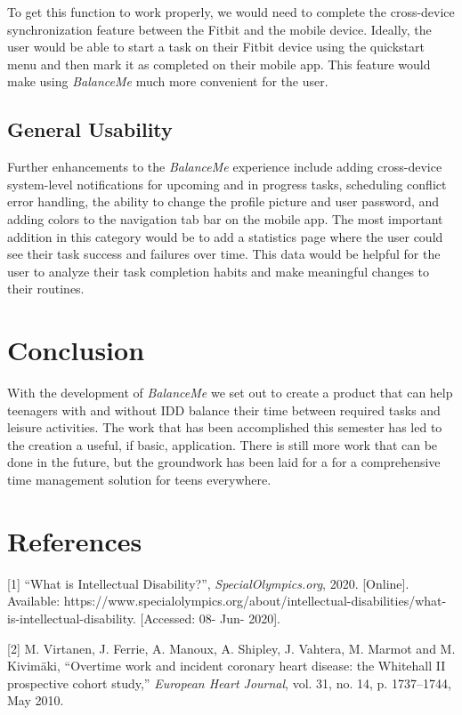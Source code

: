 \documentclass{sigchi}
\begin{document}
To get this function to work properly, we would need to complete the
cross-device synchronization feature between the Fitbit and the mobile device.
Ideally, the user would be able to start a task on their Fitbit device using
the quickstart menu and then mark it as completed on their mobile app. This
feature would make using \textit{BalanceMe} much more convenient for the user.

\subsection{General Usability}
Further enhancements to the \textit{BalanceMe} experience include adding
cross-device system-level notifications for upcoming and in progress tasks,
scheduling conflict error handling, the ability to change the profile picture
and user password, and adding colors to the navigation tab bar on the mobile
app. The most important addition in this category would be to add a statistics
page where the user could see their task success and failures over time. This
data would be helpful for the user to analyze their task completion habits and
make meaningful changes to their routines.


\section{Conclusion}

With the development of \textit{BalanceMe} we set out to create a product that
can help teenagers with and without IDD balance their time between required
tasks and leisure activities. The work that has been accomplished this semester
has led to the creation a useful, if basic, application. There is still more
work that can be done in the future, but the groundwork has been laid for a for
a comprehensive time management solution for teens everywhere.


\section{References}

[1] ``What is Intellectual Disability?'', \textit{SpecialOlympics.org}, 2020. [Online]. Available: https://www.specialolympics.org/about/intellectual-disabilities/what-is-intellectual-disability. [Accessed: 08- Jun- 2020].

[2] M. Virtanen, J. Ferrie, A. Manoux, A. Shipley, J. Vahtera, M. Marmot and M. Kivimäki, ``Overtime work and incident coronary heart disease: the Whitehall II prospective cohort study,'' \textit{European Heart Journal}, vol. 31, no. 14, p. 1737–1744, May 2010.
\end{document}
